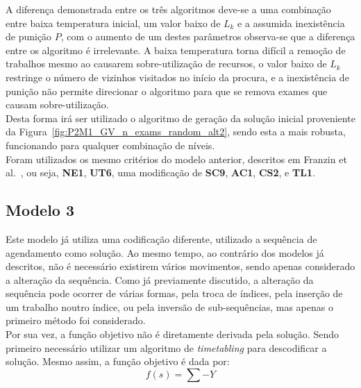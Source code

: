 A diferença demonstrada entre os três algoritmos deve-se a uma combinação entre baixa temperatura inicial, um valor baixo de $L_{k}$ e a assumida inexistência de punição $P$, com o aumento de um destes parâmetros observa-se que a diferença entre os algoritmo é irrelevante. A baixa temperatura torna difícil a remoção de trabalhos mesmo ao causarem sobre-utilização de recursos, o valor baixo de $L_{k}$ restringe o número de vizinhos visitados no início da procura, e a inexistência de punição não permite direcionar o algoritmo para que se remova exames que causam sobre-utilização.\\
Desta forma irá ser utilizado o algoritmo de geração da solução inicial proveniente da Figura~\ref{fig:P2M1_GV_n_exams_random_alt2}, sendo esta a mais robusta, funcionando para qualquer combinação de níveis.\\

Foram utilizados os mesmo critérios do modelo anterior, descritos em Franzin et al.~\cite{franzinRevisitingSimulatedAnnealing2019}, ou seja, \textbf{NE1}, \textbf{UT6}, uma modificação de \textbf{SC9}, \textbf{AC1}, \textbf{CS2}, e \textbf{TL1}.\\

\subsection{Modelo 3}

Este modelo já utiliza uma codificação diferente, utilizado a sequência de agendamento como solução. Ao mesmo tempo, ao contrário dos modelos já descritos, não é necessário existirem vários movimentos, sendo apenas considerado a alteração da sequência. Como já previamente discutido, a alteração da sequência pode ocorrer de várias formas, pela troca de índices, pela inserção de um trabalho noutro índice, ou pela inversão de sub-sequências, mas apenas o primeiro método foi considerado.\\
Por sua vez, a função objetivo não é diretamente derivada pela solução. Sendo primeiro necessário utilizar um algoritmo de \textit{timetabling} para descodificar a solução. Mesmo assim, a função objetivo é dada por:
$$f(s) = \sum -Y$$

